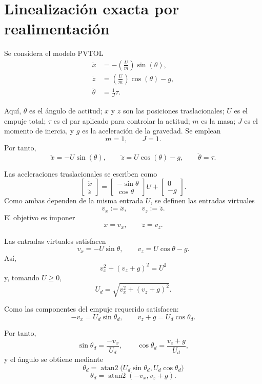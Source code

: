 \section{Linealización exacta por realimentación}

Se considera el modelo PVTOL
\begin{align}
  \ddot{x}      &= -\left(\frac{U}{m}\right)\sin(\theta), \label{eq:x}\\
  \ddot{z}      &=  \left(\frac{U}{m}\right)\cos(\theta)-g, \label{eq:z}\\
  \ddot{\theta} &= \frac{1}{J}\tau. \label{eq:theta}
\end{align}

Aquí, $\theta$ es el ángulo de actitud; $x$ y $z$ son las posiciones
traslacionales; $U$ es el empuje total; $\tau$ es el par aplicado para
controlar la actitud; $m$ es la masa; $J$ es el momento de inercia, y $g$ es
la aceleración de la gravedad. Se emplean
\[
  m=1,\qquad J=1.
\]
Por tanto,
\[
  \ddot{x}=-U\sin(\theta),\qquad
  \ddot{z}=U\cos(\theta)-g,\qquad
  \ddot{\theta}=\tau.
\]

Las aceleraciones traslacionales se escriben como
\[
  \begin{bmatrix}\ddot{x}\\\ddot{z}\end{bmatrix}
  =
  \begin{bmatrix}-\sin\theta\\\cos\theta\end{bmatrix}U+
  \begin{bmatrix}0\\-g\end{bmatrix}.
\]
Como ambas dependen de la misma entrada $U$, se definen las entradas virtuales
\[
  \boxed{v_x:=\ddot{x}},\qquad
  \boxed{v_z:=\ddot{z}}.
\]
El objetivo es imponer
\[
  \boxed{\ddot{x}=v_x,\qquad \ddot{z}=v_z}.
\]

Las entradas virtuales satisfacen
\[
  v_x=-U\sin\theta,\qquad
  v_z=U\cos\theta-g.
\]
Así,
\[
  v_x^2+(v_z+g)^2=U^2
\]
y, tomando $U\geq 0$,
\begin{equation}
  \boxed{U_d=\sqrt{v_x^2+(v_z+g)^2}}. \label{eq:Ud}
\end{equation}

Como las componentes del empuje requerido satisfacen:
\[
  -v_x=U_d\sin\theta_d,\qquad
  v_z+g=U_d\cos\theta_d.
\]

Por tanto,
\[
  \sin\theta_d=\frac{-v_x}{U_d},\qquad
  \cos\theta_d=\frac{v_z+g}{U_d},
\]
y el ángulo se obtiene mediante
\[
  \theta_d=
  \operatorname{atan2}\bigl(U_d\sin\theta_d,U_d\cos\theta_d\bigr)
\]
\[
  \boxed{\theta_d=\operatorname{atan2}(-v_x,v_z+g)}. \label{eq:theta-d}
\]